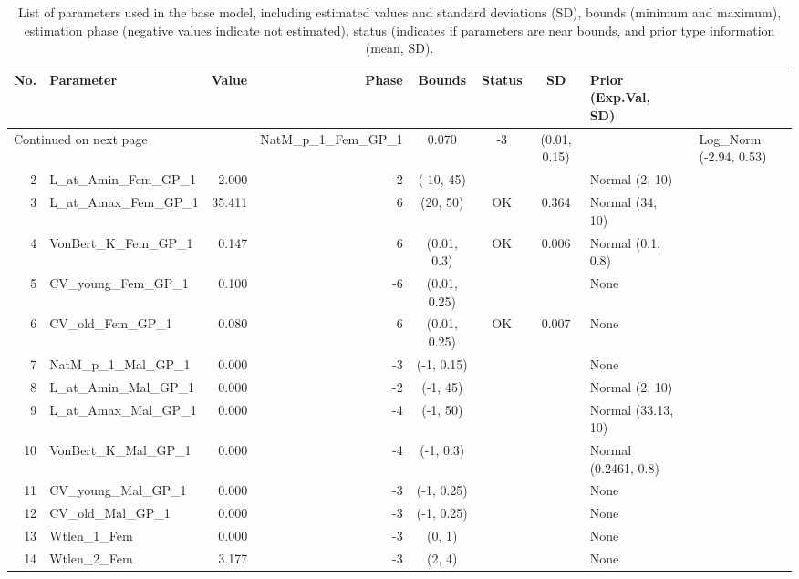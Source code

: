 \documentclass[12pt,]{article}
\begin{document}
\begin{landscape}
\begin{longtable}{rlrrcccl}
\caption{List of parameters used in
                                              the base model, including estimated 
                                              values and standard deviations (SD), 
                                              bounds (minimum and maximum), 
                                              estimation phase (negative values indicate
                                              not estimated), status (indicates if 
                                              parameters are near bounds, and prior type
                                              information (mean, SD).} \\ 
  \hline
No. & Parameter & Value & Phase & Bounds & Status & SD & Prior (Exp.Val, SD)  \\ 
  \hline 
\endhead 
\hline 
\multicolumn{3}{l}{\footnotesize Continued on next page} 
\endfoot 
\endlastfoot 
 \hline
1 & NatM\_p\_1\_Fem\_GP\_1 & 0.070 & -3 & (0.01, 0.15) &  &  & Log\_Norm (-2.94, 0.53) \\ 
  2 & L\_at\_Amin\_Fem\_GP\_1 & 2.000 & -2 & (-10, 45) &  &  & Normal (2, 10) \\ 
  3 & L\_at\_Amax\_Fem\_GP\_1 & 35.411 & 6 & (20, 50) & OK & 0.364 & Normal (34, 10) \\ 
  4 & VonBert\_K\_Fem\_GP\_1 & 0.147 & 6 & (0.01, 0.3) & OK & 0.006 & Normal (0.1, 0.8) \\ 
  5 & CV\_young\_Fem\_GP\_1 & 0.100 & -6 & (0.01, 0.25) &  &  & None \\ 
  6 & CV\_old\_Fem\_GP\_1 & 0.080 & 6 & (0.01, 0.25) & OK & 0.007 & None \\ 
  7 & NatM\_p\_1\_Mal\_GP\_1 & 0.000 & -3 & (-1, 0.15) &  &  & None \\ 
  8 & L\_at\_Amin\_Mal\_GP\_1 & 0.000 & -2 & (-1, 45) &  &  & Normal (2, 10) \\ 
  9 & L\_at\_Amax\_Mal\_GP\_1 & 0.000 & -4 & (-1, 50) &  &  & Normal (33.13, 10) \\ 
  10 & VonBert\_K\_Mal\_GP\_1 & 0.000 & -4 & (-1, 0.3) &  &  & Normal (0.2461, 0.8) \\ 
  11 & CV\_young\_Mal\_GP\_1 & 0.000 & -3 & (-1, 0.25) &  &  & None \\ 
  12 & CV\_old\_Mal\_GP\_1 & 0.000 & -3 & (-1, 0.25) &  &  & None \\ 
  13 & Wtlen\_1\_Fem & 0.000 & -3 & (0, 1) &  &  & None \\ 
  14 & Wtlen\_2\_Fem & 3.177 & -3 & (2, 4) &  &  & None \\ 

\end{longtable}
\end{landscape}
\end{document}
